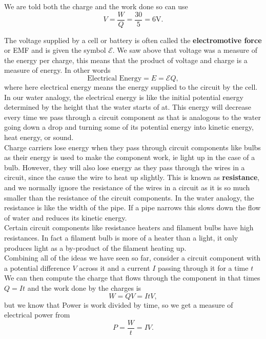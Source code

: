\documentclass[a4paper,12pt]{book}
\begin{document}
We are told both the charge and the work done so can use
\begin{equation*}
V=\frac{W}{Q}=\frac{30}{5}=6\text{V}.
\end{equation*}

The voltage supplied by a cell or battery is often called the \textbf{electromotive force} or EMF and is given the symbol $\mathcal{E}$. We saw above that voltage was a measure of the energy per charge, this means that the product of voltage and charge is a measure of energy. In other words
\begin{equation}
\text{Electrical Energy}=E=\mathcal{E}Q,
\end{equation}
where here electrical energy means the energy supplied to the circuit by the cell.\\

In our water analogy, the electrical energy is like the initial potential energy determined by the height that the water starts of at. This energy will decrease every time we pass through a circuit component as that is analogous to the water going down a drop and turning some of its potential energy into kinetic energy, heat energy, or sound.\\

Charge carriers lose energy when they pass through circuit components like bulbs as their energy is used to make the component work, ie light up in the case of a bulb. However, they will also lose energy as they pass through the wires in a circuit, since the cause the wire to heat up slightly. This is known as \textbf{resistance}, and we normally ignore the resistance of the wires in a circuit as it is so much smaller than the resistance of the circuit components. In the water analogy, the resistance is like the width of the pipe. If a pipe narrows this slows down the flow of water and reduces its kinetic energy.\\

Certain circuit components like resistance heaters and filament bulbs have high resistances. In fact a filament bulb is more of a heater than a light, it only produces light as a by-product of the filament heating up.\\

Combining all of the ideas we have seen so far, consider a circuit component with a potential difference $V$ across it and a current $I$ passing through it for a time $t$ We can then compute the charge that flows through the component in that times $Q=It$ and the work done by the charges is
\begin{equation*}
W=QV=ItV,
\end{equation*}
but we know that Power is work divided by time, so we get a measure of electrical power from
\begin{equation*}
P=\frac{W}{t}=IV.
\end{equation*}
\end{document}
